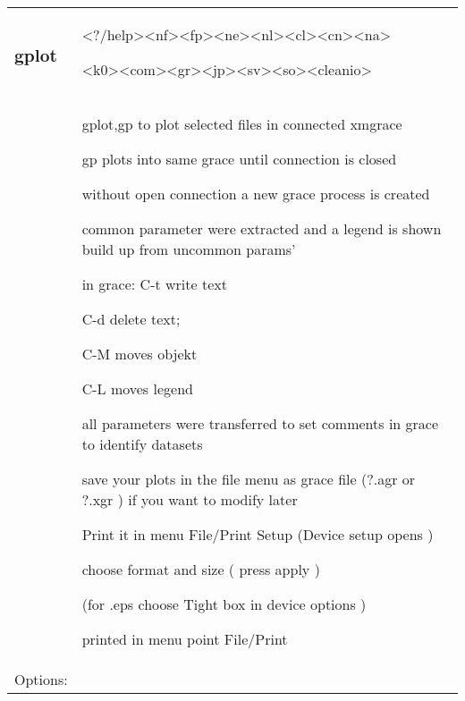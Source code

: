 \documentclass[]{article}
\begin{document}
\begin{longtable}[]{@{}ll@{}}
\toprule
\endhead
\begin{minipage}[t]{0.47\columnwidth}\raggedright
\hypertarget{gplot}{%
\subsubsection{gplot}\label{gplot}}\strut
\end{minipage} & \begin{minipage}[t]{0.47\columnwidth}\raggedright
\textless{}?/help\textgreater{}\textless{}nf\textgreater{}\textless{}fp\textgreater{}\textless{}ne\textgreater{}\textless{}nl\textgreater{}\textless{}cl\textgreater{}\textless{}cn\textgreater{}\textless{}na\textgreater{}

\textless{}k0\textgreater{}\textless{}com\textgreater{}\textless{}gr\textgreater{}\textless{}jp\textgreater{}\textless{}sv\textgreater{}\textless{}so\textgreater{}\textless{}cleanio\textgreater{}\strut
\end{minipage}\tabularnewline
\begin{minipage}[t]{0.47\columnwidth}\raggedright
\strut
\end{minipage} & \begin{minipage}[t]{0.47\columnwidth}\raggedright
gplot,gp to plot selected files in connected xmgrace

gp plots into same grace until connection is closed

without open connection a new grace process is created

common parameter were extracted and a legend is shown build up from
uncommon params'

in grace: C-t write text

C-d delete text;

C-M moves objekt

C-L moves legend

all parameters were transferred to set comments in grace to identify
datasets

save your plots in the file menu as grace file (?.agr or ?.xgr ) if you
want to modify later

Print it in menu File/Print Setup (Device setup opens )

choose format and size ( press apply )

(for .eps choose Tight box in device options )

printed in menu point File/Print\strut
\end{minipage}\tabularnewline
\begin{minipage}[t]{0.47\columnwidth}\raggedright
Options:


\end{minipage}
\end{longtable}
\end{document}
